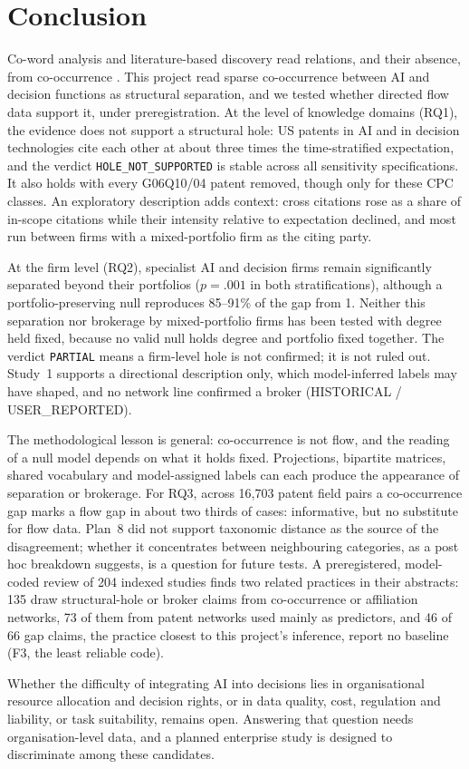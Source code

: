 \section{Conclusion}
\label{sec:conclusion}

Co-word analysis and literature-based discovery read relations, and their absence, from co-occurrence \citep{callon1983translations,swanson1986fish}. This project read sparse co-occurrence between AI and decision functions as structural separation, and we tested whether directed flow data support it, under preregistration. At the level of knowledge domains (RQ1), the evidence does not support a structural hole: US patents in AI and in decision technologies cite each other at about three times the time-stratified expectation, and the verdict \texttt{HOLE\_\allowbreak NOT\_\allowbreak SUPPORTED} is stable across all sensitivity specifications. It also holds with every G06Q10/04 patent removed, though only for these CPC classes. An exploratory description adds context: cross citations rose as a share of in-scope citations while their intensity relative to expectation declined, and most run between firms with a mixed-portfolio firm as the citing party.

At the firm level (RQ2), specialist AI and decision firms remain significantly separated beyond their portfolios ($p=.001$ in both stratifications), although a portfolio-preserving null reproduces 85--91\% of the gap from 1. Neither this separation nor brokerage by mixed-portfolio firms has been tested with degree held fixed, because no valid null holds degree and portfolio fixed together. The verdict \texttt{PARTIAL} means a firm-level hole is not confirmed; it is not ruled out. Study~1 supports a directional description only, which model-inferred labels may have shaped, and no network line confirmed a broker (HISTORICAL / USER\_REPORTED).

The methodological lesson is general: co-occurrence is not flow, and the reading of a null model depends on what it holds fixed. Projections, bipartite matrices, shared vocabulary and model-assigned labels can each produce the appearance of separation or brokerage. For RQ3, across 16,703 patent field pairs a co-occurrence gap marks a flow gap in about two thirds of cases: informative, but no substitute for flow data. Plan~8 did not support taxonomic distance as the source of the disagreement; whether it concentrates between neighbouring categories, as a post hoc breakdown suggests, is a question for future tests. A preregistered, model-coded review of 204 indexed studies finds two related practices in their abstracts: 135 draw structural-hole or broker claims from co-occurrence or affiliation networks, 73 of them from patent networks used mainly as predictors, and 46 of 66 gap claims, the practice closest to this project's inference, report no baseline (F3, the least reliable code).

Whether the difficulty of integrating AI into decisions lies in organisational resource allocation and decision rights, or in data quality, cost, regulation and liability, or task suitability, remains open. Answering that question needs organisation-level data, and a planned enterprise study is designed to discriminate among these candidates.

